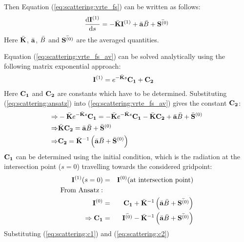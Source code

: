 Then Equation (\ref{eq:scattering:vrte_fs}) can be written as follows:
 \begin{eqnarray}
     \frac{\mathrm{d} {\bf I}^{(1)}}{\mathrm{d} s} =
     -\bar{{\bf K}} {\bf I}^{(1)} + \bar{{\bf a}} \bar{B}
     +\bar{{\bf S}^{(0)}}
\label{eq:scattering:vrte_fs_av}
\end{eqnarray} 
Here $\bar{{\bf K}}$, $\bar{{\bf a}}$, $\bar{B}$ and
$\bar{{\bf S}^{(0)}}$ are the averaged quantities.



Equation (\ref{eq:scattering:vrte_fs_av}) can be solved analytically
using the following matrix exponential approach:
 \begin{eqnarray}
 \label{eq:scattering:ansatz}
&   {\bf I}^{(1)} = e^{-\bar{{\bf K}}s}{\bf C_1} + {\bf C_2}
\end{eqnarray}
Here ${\bf C_1}$ and ${\bf C_2}$ are constants which have to be
determined. Substituting (\ref{eq:scattering:ansatz}) into
(\ref{eq:scattering:vrte_fs_av}) gives the constant ${\bf C_2}$:
\begin{eqnarray}
 \Rightarrow& -\bar{{\bf K}}e^{-\bar{{\bf K}}s}{\bf C_1} = -\bar{{\bf K}}e^{-\bar{{\bf K}}s}{\bf C_1} - \bar{{\bf K}} {\bf C_2}+ \bar{{\bf a}} \bar{B} +\bar{{\bf S}}^{(0)}\\
\Rightarrow&  \bar{{\bf K}} {\bf C_2} = \bar{{\bf a}} \bar{B} +\bar{{\bf S}}^{(0)}\\
\Rightarrow& {\bf C_2} =  \bar{{\bf K}}^{-1}\left(\bar{{\bf a}} \bar{B} +\bar{{\bf S}}^{(0)}\right)
 \label{eq:scattering:c1}
\end{eqnarray}
${\bf C_1}$ can be determined using the initial condition, which is
the radiation at the intersection point ($s=0$) travelling towards the
considered gridpoint:
\begin{eqnarray}
   \StoVec^{(1)}(s=0) &=& \StoVec^{(0)} {\rm(at\ intersection\ point)}\\
\rm{From\ Ansatz:} &&\\
\StoVec^{(0)} &=& {\bf C_1} +  \bar{\ExtMat}\Inv\left(\bar{\AbsVec} \bar{\Planck} +\bar{\ScaInt^{(0)}}\right)\\
\Rightarrow   {\bf C_1} &=& \bar{\StoVec^{(0)}} -  \bar{\ExtMat}\Inv \left(\bar{\AbsVec} \bar{\Planck} +\bar{\ScaInt^{(0)}}\right)
\label{eq:scattering:c2}
\end{eqnarray}
Substituting (\ref{eq:scattering:c1}) and (\ref{eq:scattering:c2})
